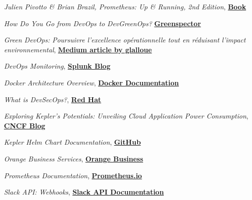\documentclass[12pt,a4paper,oneside]{book}
\begin{document}










\appendix


%



\begin{thebibliography}{99}
    
    \emph{Julien Pivotto \& Brian Brazil, Prometheus: Up \& Running, 2nd Edition},
    \href{https://www.oreilly.com/library/view/prometheus-up/9781098131135/}{\textbf{Book}}
    
    \emph{How Do You Go from DevOps to DevGreenOps?}
    \href{https://greenspector.com/en/how-do-you-go-from-devops-to-devgreenops/}{\textbf{Greenspector}}
    
    \emph{Green DevOps: Poursuivre l'excellence opérationnelle tout en réduisant l'impact environnemental},
    \href{https://glalloue.medium.com/green-devops-poursuivre-lexcellence-op%C3%A9rationnelle-tout-en-r%C3%A9duisant-l-impact-environnemental-de500cfcc9eb}{\textbf{Medium article by glalloue}}
    
    \emph{DevOps Monitoring},
    \href{https://www.splunk.com/en_us/blog/learn/devops-monitoring.html}{\textbf{Splunk Blog}}
    
    \emph{Docker Architecture Overview},
    \href{https://docs.docker.com/get-started/overview/#:~:text=with%20fewer%20resources.-,Docker%20architecture,to%20a%20remote%20Docker%20daemon.}{\textbf{Docker Documentation}}
    
    \emph{What is DevSecOps?},
    \href{https://www.redhat.com/en/topics/devops/what-is-devsecops}{\textbf{Red Hat}}
    
    \emph{Exploring Kepler's Potentials: Unveiling Cloud Application Power Consumption},
    \href{https://www.cncf.io/blog/2023/10/11/exploring-keplers-potentials-unveiling-cloud-application-power-consumption/}{\textbf{CNCF Blog}}
    
    \emph{Kepler Helm Chart Documentation},
    \href{https://github.com/sustainable-computing-io/kepler-helm-chart/blob/main/README.md}{\textbf{GitHub}}
    
    \emph{Orange Business Services},
    \href{https://www.orange-business.com/fr}{\textbf{Orange Business}}
    
    \emph{Prometheus Documentation},
    \href{https://prometheus.io/docs}{\textbf{Prometheus.io}}
    
    \emph{Slack API: Webhooks},
    \href{https://api.slack.com/messaging/webhooks}{\textbf{Slack API Documentation}}
    
    \end{thebibliography}
    
\end{document}
